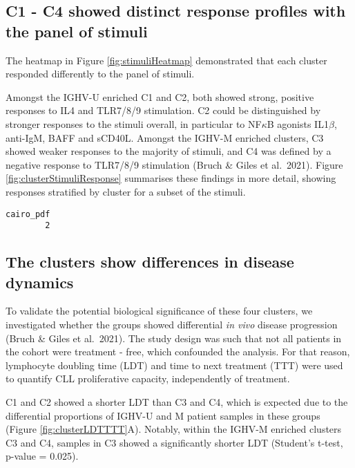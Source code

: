\documentclass[11pt, a4paper, twosided]{book}
\begin{document}
\hypertarget{c1---c4-showed-distinct-response-profiles-with-the-panel-of-stimuli}{%
\subsection{C1 - C4 showed distinct response profiles with the panel of stimuli}\label{c1---c4-showed-distinct-response-profiles-with-the-panel-of-stimuli}}

The heatmap in Figure \ref{fig:stimuliHeatmap} demonstrated that each cluster responded differently to the panel of stimuli.

Amongst the IGHV-U enriched C1 and C2, both showed strong, positive responses to IL4 and TLR7/8/9 stimulation. C2 could be distinguished by stronger responses to the stimuli overall, in particular to NF\(\kappa\)B agonists IL1\(\beta\), anti-IgM, BAFF and sCD40L. Amongst the IGHV-M enriched clusters, C3 showed weaker responses to the majority of stimuli, and C4 was defined by a negative response to TLR7/8/9 stimulation (Bruch \& Giles et al.~2021). Figure \ref{fig:clusterStimuliResponse} summarises these findings in more detail, showing responses stratified by cluster for a subset of the stimuli.


\begin{verbatim}
cairo_pdf 
        2 
\end{verbatim}
\hypertarget{the-clusters-show-differences-in-disease-dynamics}{%
\subsection{The clusters show differences in disease dynamics}\label{the-clusters-show-differences-in-disease-dynamics}}

To validate the potential biological significance of these four clusters, we investigated whether the groups showed differential \emph{in vivo} disease progression (Bruch \& Giles et al.~2021). The study design was such that not all patients in the cohort were treatment - free, which confounded the analysis. For that reason, lymphocyte doubling time (LDT) and time to next treatment (TTT) were used to quantify CLL proliferative capacity, independently of treatment.

C1 and C2 showed a shorter LDT than C3 and C4, which is expected due to the differential proportions of IGHV-U and M patient samples in these groups (Figure \ref{fig:clusterLDTTTT}A). Notably, within the IGHV-M enriched clusters C3 and C4, samples in C3 showed a significantly shorter LDT (Student's t-test, p-value = 0.025).
\end{document}
